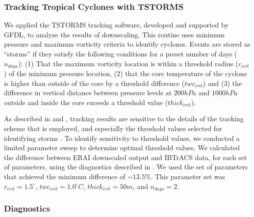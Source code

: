 \documentclass[phd,tocprelim]{cornell}
\begin{document}
\subsubsection{Tracking Tropical Cyclones with TSTORMS}\label{tstorms}

We applied the TSTORMS \cite{tc_algo} tracking software, developed and
supported by GFDL, to analyze the results of downscaling. This routine
uses minimum pressure and maximum vorticity criteria to identify
cyclones. Events are stored as ``storms'' if they satisfy the
following conditions for a preset number of days ($n_{days}$): (1)
That the maximum vorticity location is within a threshold radius
($r_{crit}$) of the minimum pressure location, (2) that the core
temperature of the cyclone is higher than outside of the core by a
threshold difference ($twc_{crit}$) and (3) the difference in vertical
distance between pressure levels at $200hPa$ and $1000hPa$ outside and
inside the core exceeds a threshold value ($thick_{crit}$).

As described in \cite{kerry_clivar} and \cite{tc_algo}, tracking
results are sensitive to the details of the tracking scheme that is
employed, and especially the threshold values selected for identifying
storms \cite{tc_track}. To identify sensitivity to threshold values,
we conducted a limited parameter sweep to determine optimal threshold
values. We calculated the difference between ERAI downscaled output
and IBTrACS data, for each set of parameters, using the diagnostics
described in . We used the set of parameters that
achieved the minimum difference of ${\sim}13.5\%$. This parameter set
was $r_{crit} = 1.5^{\circ}$, $twc_{crit} = 1.0^{\circ}C$,
$thick_{crit} = 50m$, and $n_{days} = 2$.

\subsubsection{Diagnostics}\label{diags}
\end{document}
